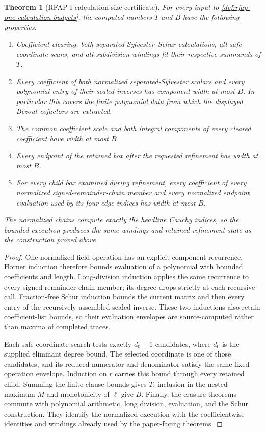 \documentclass[11pt]{article}
\newtheorem{theorem}{Theorem}[section]
\begin{document}
\begin{theorem}[RFAP-I calculation-size certificate]
\label{thm:rfap-one-calculation-size}
For every input to \cref{def:rfap-one-calculation-budgets}, the computed
numbers $T$ and $B$ have the following properties.
\begin{enumerate}
\item Coefficient clearing, both separated-Sylvester--Schur calculations,
all safe-coordinate scans, and all subdivision windings fit their respective
summands of $T$.
\item Every coefficient of both normalized separated-Sylvester scalars and
every polynomial entry of their scaled inverses has component width at most
$B$.  In particular this covers the finite polynomial data from which the
displayed B\'ezout cofactors are extracted.
\item The common coefficient scale and both integral components of every
cleared coefficient have width at most $B$.
\item Every endpoint of the retained box after the requested refinement has
width at most $B$.
\item For every child box examined during refinement, every coefficient of
every normalized signed-remainder-chain member and every normalized endpoint
evaluation used by its four edge indices has width at most $B$.
\end{enumerate}
The normalized chains compute exactly the headline Cauchy indices, so the
bounded execution produces the same windings and retained refinement state as
the construction proved above.
\end{theorem}

\begin{proof}
One normalized field operation has an explicit component recurrence.  Horner
induction therefore bounds evaluation of a polynomial with bounded
coefficients and length.  Long-division induction applies the same recurrence
to every signed-remainder-chain member; its degree drops strictly at each
recursive call.  Fraction-free Schur induction bounds the current matrix and
then every entry of the recursively assembled scaled inverse.  These two
inductions also retain coefficient-list bounds, so their evaluation envelopes
are source-computed rather than maxima of completed traces.

Each safe-coordinate search tests exactly $d_0+1$ candidates, where $d_0$ is
the supplied eliminant degree bound.  The selected coordinate is one of those
candidates, and its reduced numerator and denominator satisfy the same
fixed operation envelope.  Induction on $r$ carries this bound through every
retained child.  Summing the finite clause bounds gives $T$; inclusion in the
nested maximum $M$ and monotonicity of $\ell$ give $B$.  Finally, the erasure
theorems commute with polynomial arithmetic, long division, evaluation, and
the Schur construction.  They identify the normalized execution with the
coefficientwise identities and windings already used by the paper-facing
theorems.
\end{proof}
\end{document}
